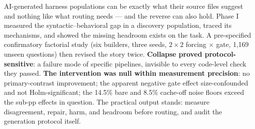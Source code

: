 AI-generated harness populations can be exactly what their source files suggest
and nothing like what routing needs --- and the reverse can also hold. Phase I
measured the syntactic--behavioral gap in a discovery population, traced its
mechanisms, and showed the missing headroom exists on the task. A
pre-specified confirmatory factorial study (six builders, three seeds,
$2{\times}2$ forcing $\times$ gate, 1{,}169 unseen questions) then revised the
story twice. \textbf{Collapse proved protocol-sensitive}: a failure mode of
specific pipelines, invisible to every code-level check they passed.
\textbf{The intervention was null within measurement precision}: no
primary-contrast improvement; the apparent negative gate effect
size-confounded and not Holm-significant; the 14.5\% bare and 8.5\%
cache-off noise floors exceed the sub-pp effects in question. The
practical output stands: measure disagreement, repair, harm, and headroom
before routing, and audit the generation protocol itself.
